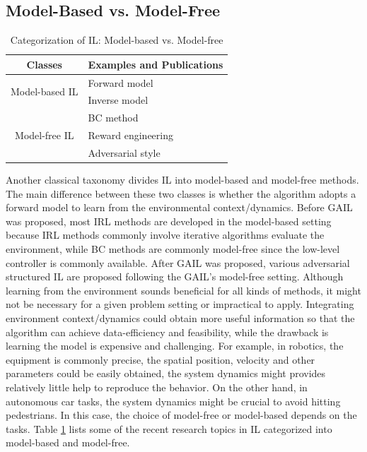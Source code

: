 \documentclass[acmsmall]{acmart}
\begin{document}
\subsection{Model-Based vs. Model-Free} 

\begin{table}[t]
\caption{Categorization of IL: Model-based vs. Model-free}
\label{table_mb_mf}
\centering
\begin{tabular}{@{}c@{\hskip 0.3in}l@{}}
\toprule
Classes & Examples and Publications\\ \midrule
\multirow{2}{*}{Model-based IL} & Forward model\cite{edwardsImitatingLatentPolicies2019,finnGuidedCostLearning2016} \\ \cmidrule(l){2-2} 
 & Inverse model\cite{nairCombiningSelfSupervisedLearning2017} \\ \midrule
\multirow{3}{*}{Model-free IL} & BC method\cite{lynchLearningLatentPlans2019} \\ \cmidrule(l){2-2} 
 & Reward engineering\cite{brownExtrapolatingSuboptimalDemonstrations2019} \\ \cmidrule(l){2-2} 
 & Adversarial style\cite{torabiGenerativeAdversarialImitation2019} \\ \bottomrule
\end{tabular}
\end{table}

Another classical taxonomy divides IL into model-based and model-free methods. The main difference between these two classes is whether the algorithm adopts a forward model to learn from the environmental context/dynamics. Before GAIL\cite{hoGenerativeAdversarialImitation2016} was proposed, most IRL methods are developed in the model-based setting because IRL methods commonly involve iterative algorithms evaluate the environment, while BC methods are commonly model-free since the low-level controller is commonly available. After GAIL was proposed, various adversarial structured IL are proposed following the GAIL's model-free setting.
Although learning from the environment sounds beneficial for all kinds of methods, it might not be necessary for a given problem setting or impractical to apply. Integrating environment context/dynamics could obtain more useful information so that the algorithm can achieve data-efficiency and feasibility, while the drawback is learning the model is expensive and challenging. For example, in robotics, the equipment is commonly precise, the spatial position, velocity and other parameters could be easily obtained, the system dynamics might provides relatively little help to reproduce the behavior. On the other hand, in autonomous car tasks, the system dynamics might be crucial to avoid hitting pedestrians. In this case, the choice of model-free or model-based depends on the tasks. Table \ref{table_mb_mf} lists some of the recent research topics in IL categorized into model-based and model-free.
\end{document}
